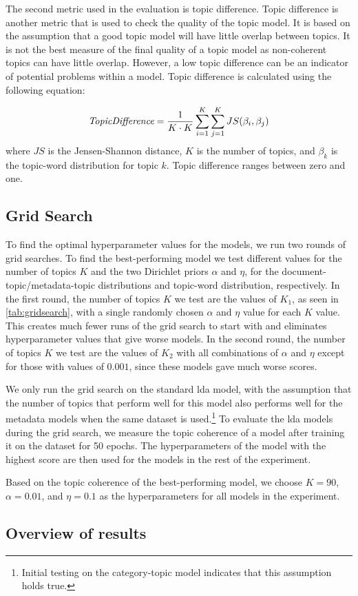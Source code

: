 The second metric used in the evaluation is topic difference.
Topic difference is another metric that is used to check the quality of the topic model.
It is based on the assumption that a good topic model will have little overlap between topics.
It is not the best measure of the final quality of a topic model as non-coherent topics can have little overlap.
However, a low topic difference can be an indicator of potential problems within a model.
Topic difference is calculated using the following equation:

\begin{equation}
	\emph{TopicDifference} = \frac{1}{K \cdot K} \sum_{i=1}^{K} \sum_{j=1}^{K} JS(\beta_{i},\beta_{j})
\end{equation}
\noindent where $JS$ is the Jensen-Shannon distance, $K$ is the number of topics, and $\beta_{k}$ is the topic-word distribution for topic $k$.
Topic difference ranges between zero and one.

\subsection{Grid Search}\label{sec:experiment_gridsearch}
To find the optimal hyperparameter values for the models, we run two rounds of grid searches.
To find the best-performing model we test different values for the number of topics $K$ and the two Dirichlet priors $\alpha$ and $\eta$, for the document-topic/metadata-topic distributions and topic-word distribution, respectively.
In the first round, the number of topics $K$ we test are the values of $K_1$, as seen in \autoref{tab:gridsearch}, with a single randomly chosen $\alpha$ and $\eta$ value for each $K$ value.
This creates much fewer runs of the grid search to start with and eliminates hyperparameter values that give worse models.
In the second round, the number of topics $K$ we test are the values of $K_2$ with all combinations of $\alpha$ and $\eta$ except for those with values of $0.001$, since these models gave much worse scores.

We only run the grid search on the standard \gls{lda} model, with the assumption that the number of topics that perform well for this model also performs well for the metadata models when the same dataset is used.\footnote{Initial testing on the category-topic model indicates that this assumption holds true.}
To evaluate the \gls{lda} models during the grid search, we measure the topic coherence of a model after training it on the dataset for 50 epochs.
The hyperparameters of the model with the highest score are then used for the models in the rest of the experiment.

Based on the topic coherence of the best-performing model, we choose $K = 90$, $\alpha = 0.01$, and $\eta = 0.1$ as the hyperparameters for all models in the experiment.



\subsection{Overview of results}\label{sec:results}


